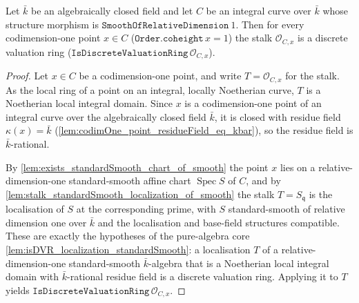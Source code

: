 \begin{lemma}

  \label{lem:stalk_isDVR_of_smooth}
  Let \(\bar k\) be an algebraically closed field and let \(C\) be an
  integral curve over \(\bar k\) whose structure morphism is
  \(\texttt{SmoothOfRelativeDimension}\ 1\). Then for every codimension-one
  point \(x \in C\) (\(\texttt{Order.coheight}\,x = 1\)) the stalk
  \(\mathcal O_{C, x}\) is a discrete valuation ring
  (\(\texttt{IsDiscreteValuationRing}\,\mathcal O_{C, x}\)).
\end{lemma}

\begin{proof}
        \leanok
  Let \(x \in C\) be a codimension-one point, and write
  \(T = \mathcal O_{C, x}\) for the stalk. As the local ring of a point on an
  integral, locally Noetherian curve, \(T\) is a Noetherian local integral
  domain. Since \(x\) is a codimension-one point of an integral curve over the
  algebraically closed field \(\bar k\), it is closed with residue field
  \(\kappa(x) = \bar k\) (\cref{lem:codimOne_point_residueField_eq_kbar}), so the
  residue field is \(\bar k\)-rational.

  By \cref{lem:exists_standardSmooth_chart_of_smooth} the point \(x\) lies on a
  relative-dimension-one standard-smooth affine chart
  \(\operatorname{Spec} S\) of \(C\), and by
  \cref{lem:stalk_standardSmooth_localization_of_smooth} the stalk
  \(T = S_{\mathfrak q}\) is the localisation of \(S\) at the corresponding
  prime, with \(S\) standard-smooth of relative dimension one over \(\bar k\)
  and the localisation and base-field structures compatible. These are exactly
  the hypotheses of the pure-algebra core
  \cref{lem:isDVR_localization_standardSmooth}: a localisation \(T\) of a
  relative-dimension-one standard-smooth \(\bar k\)-algebra that is a Noetherian
  local integral domain with \(\bar k\)-rational residue field is a discrete
  valuation ring. Applying it to \(T\) yields
  \(\texttt{IsDiscreteValuationRing}\,\mathcal O_{C, x}\).
\end{proof}

